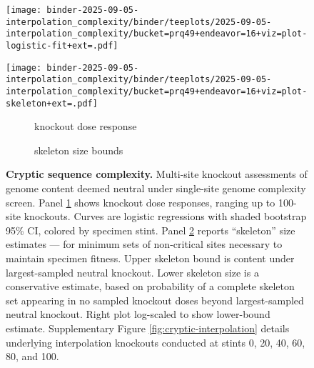 \begin{figure}

\begin{minipage}{\linewidth}
\centering
\begin{minipage}{0.4\linewidth}
\texttt{[image: binder-2025-09-05-interpolation\_complexity/binder/teeplots/2025-09-05-interpolation\_complexity/bucket=prq49+endeavor=16+viz=plot-logistic-fit+ext=.pdf]}
\end{minipage}%
\begin{minipage}{0.6\linewidth}
\texttt{[image: binder-2025-09-05-interpolation\_complexity/binder/teeplots/2025-09-05-interpolation\_complexity/bucket=prq49+endeavor=16+viz=plot-skeleton+ext=.pdf]}
\end{minipage}
\end{minipage}

\vspace{-1ex}\textsc{}

\begin{minipage}{\linewidth}
\centering
\begin{subfigure}[t]{0.4\linewidth}
\caption{\footnotesize knockout dose response}
\label{fig:cryptic:logistic}
\end{subfigure}%
\begin{subfigure}[t]{0.6\linewidth}
\caption{\footnotesize skeleton size bounds}
\label{fig:cryptic:skeleton}
\end{subfigure}
\end{minipage}

\caption{
\textbf{Cryptic sequence complexity.}
Multi-site knockout assessments of genome content deemed neutral under single-site genome complexity screen.
Panel \ref{fig:cryptic:logistic} shows knockout dose responses, ranging up to 100-site knockouts.
Curves are logistic regressions with shaded bootstrap 95\% CI, colored by specimen stint.
Panel \ref{fig:cryptic:skeleton} reports ``skeleton'' size estimates --- for minimum sets of non-critical sites necessary to maintain specimen fitness.
Upper skeleton bound is content under largest-sampled neutral knockout.
Lower skeleton size is a conservative estimate, based on probability of a complete skeleton set appearing in no sampled knockout doses beyond largest-sampled neutral knockout.
Right plot log-scaled to show lower-bound estimate.
Supplementary Figure \ref{fig:cryptic-interpolation} details underlying interpolation knockouts conducted at stints 0, 20, 40, 60, 80, and 100.
}
\label{fig:cryptic}

\end{figure}
